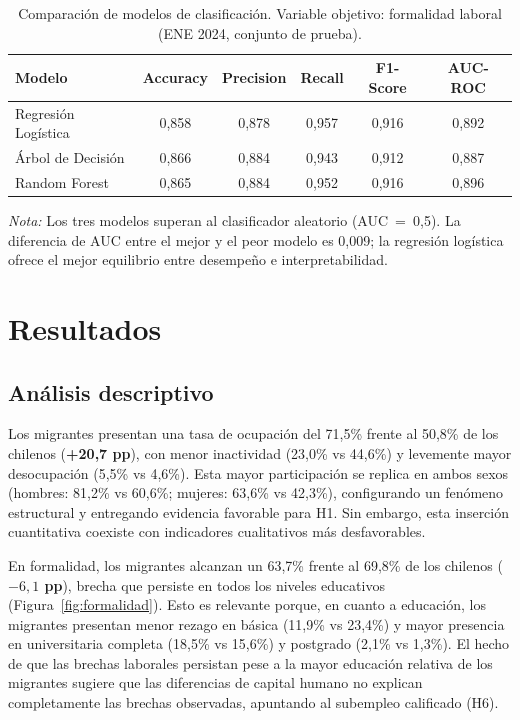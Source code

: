 \begin{table}[H]
	\centering
	\caption{Comparación de modelos de clasificación. Variable objetivo: formalidad laboral (ENE 2024, conjunto de prueba).}
	\label{tab:comparacion_modelos}
	\begin{tabular}{lccccc}
		\toprule
		\textbf{Modelo} & \textbf{Accuracy} & \textbf{Precision} & \textbf{Recall} & \textbf{F1-Score} & \textbf{AUC-ROC} \\
		\midrule
		Regresión Logística & 0{,}858 & 0{,}878 & 0{,}957 & 0{,}916 & 0{,}892 \\
		Árbol de Decisión   & 0{,}866 & 0{,}884 & 0{,}943 & 0{,}912 & 0{,}887 \\
		Random Forest       & 0{,}865 & 0{,}884 & 0{,}952 & 0{,}916 & 0{,}896 \\
		\bottomrule
	\end{tabular}
	\begin{flushleft}
		\footnotesize \textit{Nota:} Los tres modelos superan al clasificador aleatorio (AUC~=~0{,}5). La diferencia de AUC entre el mejor y el peor modelo es 0{,}009; la regresión logística ofrece el mejor equilibrio entre desempeño e interpretabilidad.
	\end{flushleft}
\end{table}


\section{Resultados}


\subsection{Análisis descriptivo}

Los migrantes presentan una tasa de ocupación del 71,5\% frente al 50,8\% de los chilenos (\textbf{+20,7 pp}), con menor inactividad (23,0\% vs 44,6\%) y levemente mayor desocupación (5,5\% vs 4,6\%). Esta mayor participación se replica en ambos sexos (hombres: 81,2\% vs 60,6\%; mujeres: 63,6\% vs 42,3\%), configurando un fenómeno estructural y entregando evidencia favorable para H1. Sin embargo, esta inserción cuantitativa coexiste con indicadores cualitativos más desfavorables.

En formalidad, los migrantes alcanzan un 63,7\% frente al 69,8\% de los chilenos (\textbf{$-6{,}1$ pp}), brecha que persiste en todos los niveles educativos (Figura~\ref{fig:formalidad}). Esto es relevante porque, en cuanto a educación, los migrantes presentan menor rezago en básica (11,9\% vs 23,4\%) y mayor presencia en universitaria completa (18,5\% vs 15,6\%) y postgrado (2,1\% vs 1,3\%). El hecho de que las brechas laborales persistan pese a la mayor educación relativa de los migrantes sugiere que las diferencias de capital humano no explican completamente las brechas observadas, apuntando al subempleo calificado (H6).

